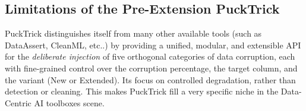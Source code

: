 \documentclass[../main.tex]{subfiles}
\begin{document}
\subsection{Limitations of the Pre-Extension PuckTrick}
\label{sec:pucktrick-limitations}

PuckTrick distinguishes itself from many other available tools (such as DataAssert, CleanML, etc..) by providing a unified, modular, and extensible API for the \emph{deliberate injection} of five
orthogonal categories of data corruption, each with fine-grained control over
the corruption percentage, the target column, and the variant (New or Extended).
Its focus on controlled degradation, rather than detection or cleaning. This makes PuckTrick fill a very specific niche in the Data-Centric AI toolboxes scene. 
\end{document}
